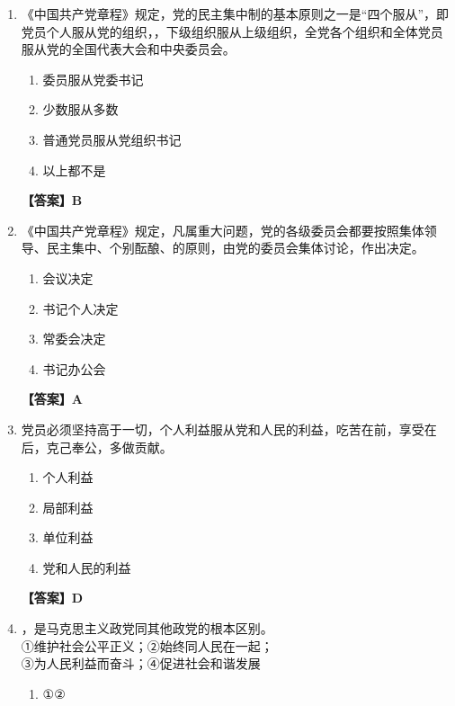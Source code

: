 \documentclass[UTF8,11pt,a4paper]{ctexart}
\begin{document}
\begin{enumerate}[label=\textbf{\arabic*.}, leftmargin=2.5em, itemsep=0.7em]
\begin{enumerate}[label=\Alph*., leftmargin=2em, itemsep=0.1em, topsep=0.15em]
\end{enumerate}
\textbf{【答案】A}
\item 《中国共产党章程》规定，党的民主集中制的基本原则之一是“四个服从”，即党员个人服从党的组织，\allowbreak\underline{\hspace{4em}}，下级组织服从上级组织，全党各个组织和全体党员服从党的全国代表大会和中央委员会。
\begin{enumerate}[label=\Alph*., leftmargin=2em, itemsep=0.1em, topsep=0.15em]
\item 委员服从党委书记
\item 少数服从多数
\item 普通党员服从党组织书记
\item 以上都不是
\end{enumerate}
\textbf{【答案】B}
\item 《中国共产党章程》规定，凡属重大问题，党的各级委员会都要按照集体领导、民主集中、个别酝酿、\allowbreak\underline{\hspace{4em}}的原则，由党的委员会集体讨论，作出决定。
\begin{enumerate}[label=\Alph*., leftmargin=2em, itemsep=0.1em, topsep=0.15em]
\item 会议决定
\item 书记个人决定
\item 常委会决定
\item 书记办公会
\end{enumerate}
\textbf{【答案】A}
\item 党员必须坚持\allowbreak\underline{\hspace{4em}}高于一切，个人利益服从党和人民的利益，吃苦在前，享受在后，克己奉公，多做贡献。
\begin{enumerate}[label=\Alph*., leftmargin=2em, itemsep=0.1em, topsep=0.15em]
\item 个人利益
\item 局部利益
\item 单位利益
\item 党和人民的利益
\end{enumerate}
\textbf{【答案】D}
\item \allowbreak\underline{\hspace{4em}}，是马克思主义政党同其他政党的根本区别。\\ ①维护社会公平正义；②始终同人民在一起；\\ ③为人民利益而奋斗；④促进社会和谐发展
\begin{enumerate}[label=\Alph*., leftmargin=2em, itemsep=0.1em, topsep=0.15em]
\item ①②

\end{enumerate}
\end{enumerate}
\end{document}
